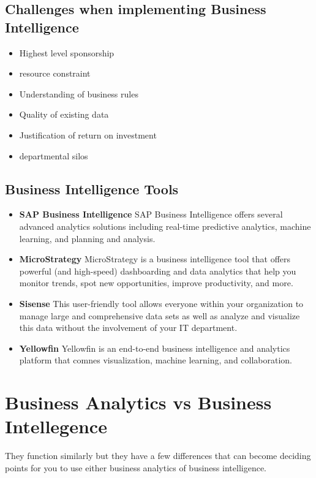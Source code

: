 \documentclass{article}
\begin{document}
\begin{multicols}{2}
\begin{itemize}
\end{itemize}

\subsection{Challenges when implementing Business Intelligence}

\begin{itemize}
\item Highest level sponsorship
\item resource constraint
\item Understanding of business rules
\item Quality of existing data
\item Justification of return on investment
\item departmental silos

\end{itemize}

\subsection{Business Intelligence Tools}
\begin{itemize}
\item \textbf{SAP Business Intelligence}
 SAP Business Intelligence offers several advanced analytics solutions including real-time  predictive analytics, machine learning, and planning and analysis.
\item \textbf{MicroStrategy}
MicroStrategy is a business intelligence tool that offers powerful (and high-speed) dashboarding and data analytics that help you monitor trends, spot new opportunities, improve productivity, and more. 
\item \textbf{Sisense}
 This user-friendly tool allows everyone within your organization to manage large and comprehensive data sets as well as analyze and visualize this data without the involvement of your IT department.
\item \textbf{Yellowfin }
Yellowfin  is an end-to-end business intelligence and analytics platform that comnes visualization, machine learning, and collaboration.
\end{itemize}
\section{Business Analytics vs Business Intellegence}
They function similarly but they have a few differences that can become deciding points for you to use either business analytics of business intelligence.\


\end{multicols}
\end{document}
